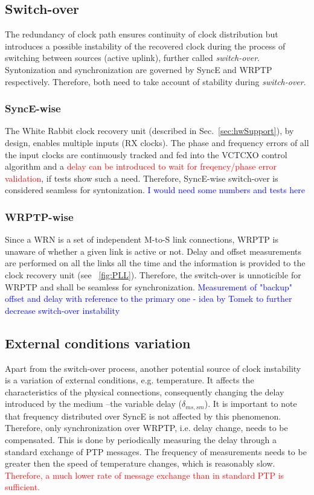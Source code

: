 \subsection{Switch-over}

The redundancy of clock path ensures continuity of clock distribution
but introduces a possible instability of the recovered clock during
the process of switching between sources (active uplink), further
called \textit{switch-over}. Syntonization and synchronization are
governed by SyncE and WRPTP respectively.  Therefore, both need to
take account of stability during \textit{switch-over}.

\subsubsection{SyncE-wise}

The White Rabbit clock recovery unit (described in
Sec.~\ref{sec:hwSupport}), by design, enables multiple inputs (RX
clocks). The phase and frequency errors of all the input clocks are
continuously tracked and fed into the VCTCXO control algorithm and a
\textcolor{red}{delay can be introduced to wait for freqency/phase
  error validation}, if tests show such a need. Therefore, SyncE-wise
switch-over is considered seamless for syntonization.
\textcolor{blue}{I would need some numbers and tests here}

\subsubsection{WRPTP-wise}

Since a WRN is a set of independent M-to-S link connections, WRPTP is
unaware of whether a given link is active or not. Delay and offset
measurements are performed on all the links all the time and the
information is provided to the clock recovery unit (see
\figurename~\ref{fig:PLL}). Therefore, the switch-over is unnoticible
for WRPTP and shall be seamless for synchronization.
\textcolor{blue}{ Measurement of "backup" offset and delay with
  reference to the primary one - idea by Tomek to further decrease
  switch-over instability }

\subsection{External conditions variation}

Apart from the switch-over process, another potential source of clock
instability is a variation of external conditions,
e.g. temperature. It affects the characteristics of the physical
connections, consequently changing the delay introduced by the medium
--the variable delay ($\delta_{ms,sm}$).  It is important to note that
frequency distributed over SyncE is not affected by this
phenomenon. Therefore, only synchronization over WRPTP, i.e. delay
change, needs to be compensated. This is done by periodically
measuring the delay through a standard exchange of PTP messages. The
frequency of measurements needs to be greater then the speed of
temperature changes, which is reasonably slow.
\textcolor{red}{Therefore, a much lower rate of message exchange than
  in standard PTP is sufficient.}

